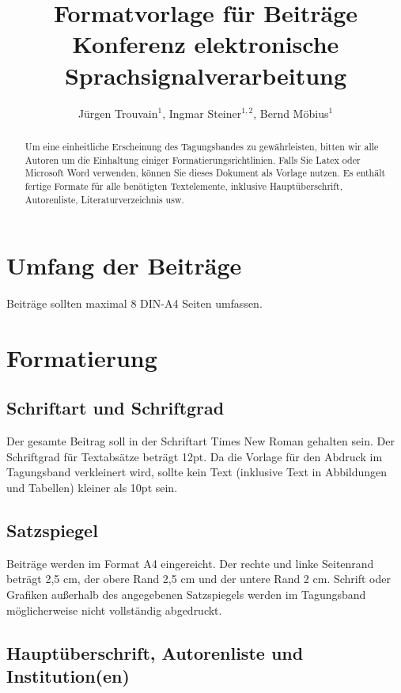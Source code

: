 \documentclass[12pt,a4paper]{article}
\title{Formatvorlage für Beiträge Konferenz elektronische Sprachsignalverarbeitung}
\author{Jürgen Trouvain$^1$, Ingmar Steiner$^{1,2}$, Bernd Möbius$^1$}
\affil{$^1$Universität des Saarlandes, $^2$DFKI GmbH}
\begin{document}

\maketitle

\begin{abstract}
  Um eine einheitliche Erscheinung des Tagungsbandes zu gewährleisten, bitten wir alle Autoren 
  um die Einhaltung einiger Formatierungsrichtlinien. Falls Sie Latex oder Microsoft Word verwenden, 
  können Sie dieses Dokument als Vorlage nutzen. Es enthält fertige Formate für alle benötigten 
  Textelemente, inklusive Hauptüberschrift, Autorenliste, Literaturverzeichnis usw.
\end{abstract}

\section{Umfang der Beiträge}

Beiträge sollten maximal 8 DIN-A4 Seiten umfassen.

\section{Formatierung}

\subsection{Schriftart und Schriftgrad}

Der gesamte Beitrag soll in der Schriftart Times New Roman gehalten sein. Der Schriftgrad für 
Textabsätze beträgt 12pt. Da die Vorlage für den Abdruck im Tagungsband verkleinert wird, sollte 
kein Text (inklusive Text in Abbildungen und Tabellen) kleiner als 10pt sein. 

\subsection{Satzspiegel}

Beiträge werden im Format A4 eingereicht. Der rechte und linke Seitenrand beträgt 2,5 cm, der 
obere Rand 2,5 cm und der untere Rand 2 cm. Schrift oder Grafiken au\ss erhalb des angegebenen 
Satzspiegels werden im Tagungsband möglicherweise nicht vollständig abgedruckt. 

\subsection{Hauptüberschrift, Autorenliste und Institution(en)}
\end{document}
